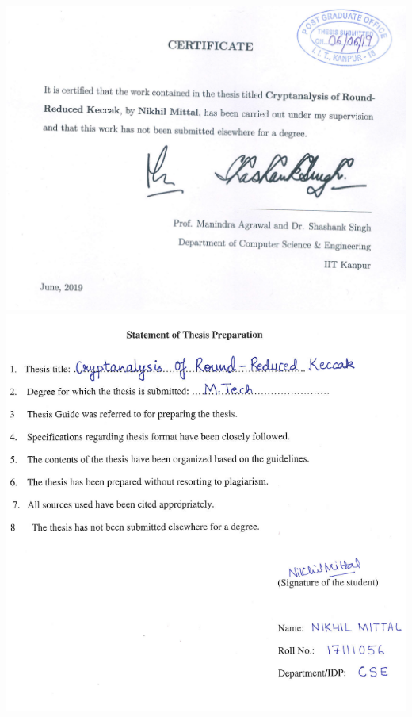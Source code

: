 \newpage
% 
\includegraphics[width=\textwidth]{Selection_003.png}
\newpage
\includegraphics[width=\textwidth]{statement.png}

